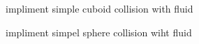 
\begin{DoxyRefList}
\item[\label{todo__todo000001}%
\hypertarget{todo__todo000001}{}%
Class \hyperlink{struct_cuboid}{Cuboid} ]impliment simple cuboid collision with fluid  
\item[\label{todo__todo000002}%
\hypertarget{todo__todo000002}{}%
Class \hyperlink{struct_sphere}{Sphere} ]impliment simpel sphere collision wiht fluid 
\end{DoxyRefList}